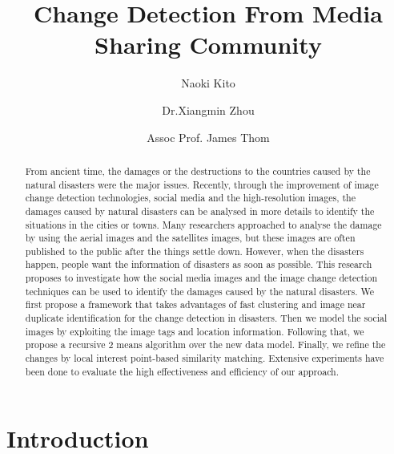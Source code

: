 \documentclass[runningheads,a4paper]{llncs}
\begin{document}
\mainmatter  %

\title{Change Detection From Media Sharing Community }

%
%

\author{Naoki Kito
\and Dr.Xiangmin Zhou\and Assoc Prof. James Thom}

\maketitle


\begin{abstract}
From ancient time, the damages or the destructions to the countries caused by the natural disasters were the major issues. Recently, through the improvement of image change detection technologies, social media and the high-resolution images, the damages caused by natural disasters can be analysed in more details to identify the situations in the cities or towns. Many researchers approached to analyse the damage by using the aerial images and the satellites images, but these images are often published to the public after the things settle down. However, when the disasters happen, people want the information of disasters as soon as possible. This research proposes to investigate how the social media images and the image change detection techniques can be used to identify the damages caused by the natural disasters. We first propose a framework that takes advantages of fast clustering and image near duplicate identification for the change detection in disasters. Then we model the social images by exploiting the image tags and location information. Following that, we propose a recursive 2 means algorithm over the new data model. Finally, we refine the changes by local interest point-based similarity matching. Extensive experiments have been done to evaluate the high effectiveness and efficiency of our approach.
\end{abstract}


\section{Introduction}
\end{document}
